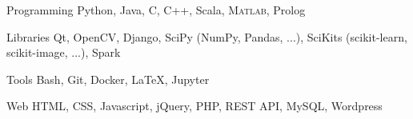 

\begin{minipage}[]{0.4\textwidth}
  \vspace{2.0mm}

  \begin{cvskills}
    \cvskill
      {Programming}
      {Python, Java, C, C++, Scala, \textsc{Matlab}, Prolog}

    \cvskill
      {Libraries}
      {Qt, OpenCV, Django, SciPy (NumPy, Pandas, ...), SciKits (scikit-learn, scikit-image, ...), Spark}

    \cvskill
      {Tools}
      {Bash, Git, Docker, \LaTeX, Jupyter}

    \cvskill
      {Web}
      {HTML, CSS, Javascript, jQuery, PHP, REST API, MySQL, Wordpress}
  \end{cvskills}
\end{minipage}%
\begin{minipage}[]{0.6\textwidth}
  \hfill
\end{minipage}
\vspace{-2.0mm}



